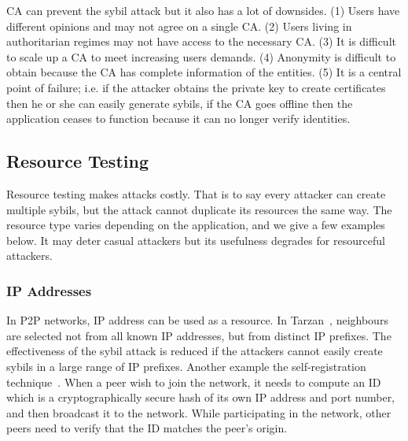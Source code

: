 CA can prevent the sybil attack but it also has a lot of downsides. (1) Users
have different opinions and may not agree on a single CA. (2) Users living in
authoritarian regimes may not have access to the necessary CA. (3) It is
difficult to scale up a CA to meet increasing users demands. (4) Anonymity is
difficult to obtain because the CA has complete information of the entities. (5)
It is a central point of failure; i.e. if the attacker obtains the private key
to create certificates then he or she can easily generate sybils, if the CA goes
offline then the application ceases to function because it can no longer verify
identities.


\subsection{Resource Testing}\label{sec:resource-testing}
Resource testing makes attacks costly. That is to say every attacker can create
multiple sybils, but the attack cannot duplicate its resources the same way. The
resource type varies depending on the application, and we give a few examples
below. It may deter casual attackers but its usefulness degrades for resourceful
attackers.


\subsubsection{IP Addresses}
In P2P networks, IP address can be used as a resource. In
Tarzan~\cite{freedman2002tarzan}, neighbours are selected not from all known IP
addresses, but from distinct IP prefixes. The effectiveness of the sybil attack
is reduced if the attackers cannot easily create sybils in a large range of IP
prefixes. Another example the self-registration
technique~\cite{dinger2006defending}. When a peer wish to join the network, it
needs to compute an ID which is a cryptographically secure hash of its own IP
address and port number, and then broadcast it to the network. While
participating in the network, other peers need to verify that the ID matches the
peer's origin.

